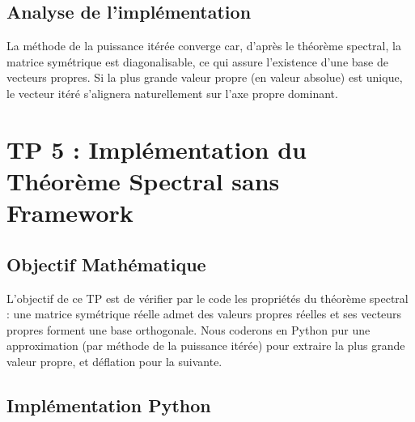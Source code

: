 \documentclass[11pt,a4paper]{article}
\begin{document}
\subsection{Analyse de l'implémentation}
La méthode de la puissance itérée converge car, d'après le théorème spectral, la matrice symétrique est diagonalisable, ce qui assure l'existence d'une base de vecteurs propres. Si la plus grande valeur propre (en valeur absolue) est unique, le vecteur itéré s'alignera naturellement sur l'axe propre dominant.

\newpage
\section{TP 5 : Implémentation du Théorème Spectral sans Framework}

\subsection{Objectif Mathématique}
L'objectif de ce TP est de vérifier par le code les propriétés du théorème spectral : une matrice symétrique réelle admet des valeurs propres réelles et ses vecteurs propres forment une base orthogonale. Nous coderons en Python pur une approximation (par méthode de la puissance itérée) pour extraire la plus grande valeur propre, et déflation pour la suivante.

\subsection{Implémentation Python}
\end{document}
